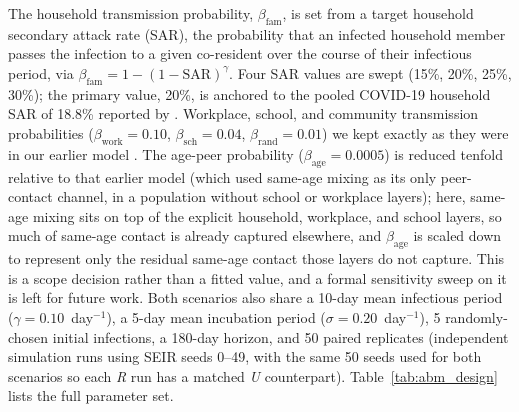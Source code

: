 \documentclass{article}
\begin{document}
The household transmission probability, $\beta_\mathrm{fam}$, is set from a target household secondary attack rate (SAR), the probability that an infected household member passes the infection to a given co-resident over the course of their infectious period, via $\beta_\mathrm{fam}=1-(1-\mathrm{SAR})^\gamma$. Four SAR values are swept (15\%, 20\%, 25\%, 30\%); the primary value, 20\%, is anchored to the pooled COVID-19 household SAR of 18.8\% reported by \citet{madewell2020household}. Workplace, school, and community transmission probabilities ($\beta_\mathrm{work}=0.10$, $\beta_\mathrm{sch}=0.04$, $\beta_\mathrm{rand}=0.01$) we kept exactly as they were in our earlier model \citep{thomopoulos2024agent}. The age-peer probability ($\beta_\mathrm{age}=0.0005$) is reduced tenfold relative to that earlier model (which used same-age mixing as its only peer-contact channel, in a population without school or workplace layers); here, same-age mixing sits on top of the explicit household, workplace, and school layers, so much of same-age contact is already captured elsewhere, and $\beta_\mathrm{age}$ is scaled down to represent only the residual same-age contact those layers do not capture. This is a scope decision rather than a fitted value, and a formal sensitivity sweep on it is left for future work. Both scenarios also share a 10-day mean infectious period ($\gamma=0.10$~day$^{-1}$), a 5-day mean incubation period ($\sigma=0.20$~day$^{-1}$), 5 randomly-chosen initial infections, a 180-day horizon, and 50 paired replicates (independent simulation runs using SEIR seeds 0--49, with the same 50 seeds used for both scenarios so each \textit{R} run has a matched \textit{U} counterpart). Table~\ref{tab:abm_design} lists the full parameter set.
\end{document}
